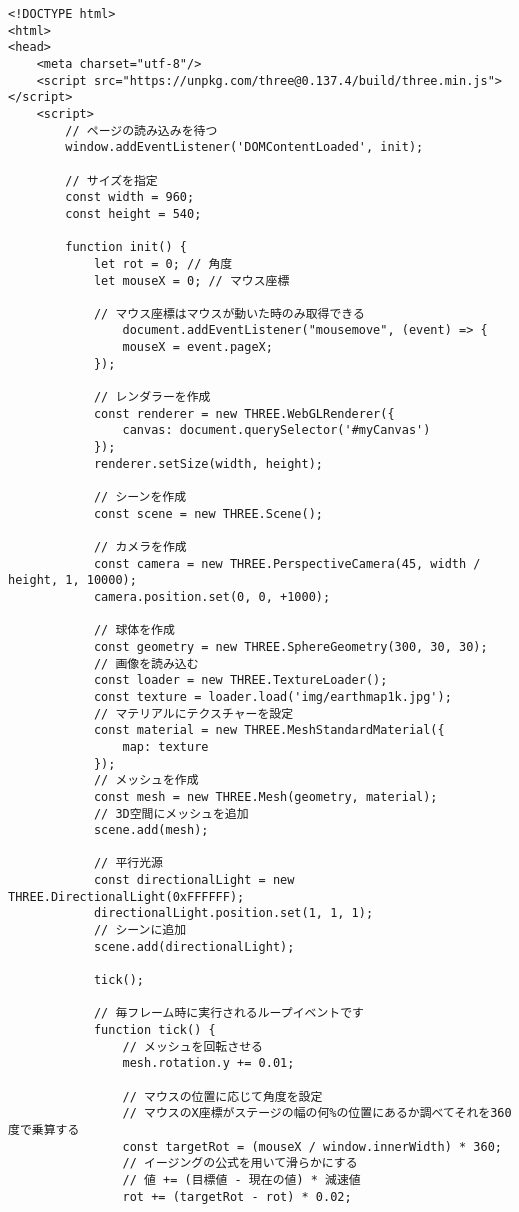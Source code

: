 \documentclass[mingoth,11pt,a4j,uplatex]{jsarticle}
\begin{document}
\begin{lstlisting}[caption=05-23.html]
<!DOCTYPE html>
<html>
<head>
    <meta charset="utf-8"/>
    <script src="https://unpkg.com/three@0.137.4/build/three.min.js"></script>
    <script>
        // ページの読み込みを待つ
        window.addEventListener('DOMContentLoaded', init);

        // サイズを指定
        const width = 960;
        const height = 540;

        function init() {
            let rot = 0; // 角度
            let mouseX = 0; // マウス座標

            // マウス座標はマウスが動いた時のみ取得できる
                document.addEventListener("mousemove", (event) => {
                mouseX = event.pageX;
            });

            // レンダラーを作成
            const renderer = new THREE.WebGLRenderer({
                canvas: document.querySelector('#myCanvas')
            });
            renderer.setSize(width, height);

            // シーンを作成
            const scene = new THREE.Scene();

            // カメラを作成
            const camera = new THREE.PerspectiveCamera(45, width / height, 1, 10000);
            camera.position.set(0, 0, +1000);

            // 球体を作成
            const geometry = new THREE.SphereGeometry(300, 30, 30);
            // 画像を読み込む
            const loader = new THREE.TextureLoader();
            const texture = loader.load('img/earthmap1k.jpg');
            // マテリアルにテクスチャーを設定
            const material = new THREE.MeshStandardMaterial({
                map: texture
            });
            // メッシュを作成
            const mesh = new THREE.Mesh(geometry, material);
            // 3D空間にメッシュを追加
            scene.add(mesh);

            // 平行光源
            const directionalLight = new THREE.DirectionalLight(0xFFFFFF);
            directionalLight.position.set(1, 1, 1);
            // シーンに追加
            scene.add(directionalLight);

            tick();

            // 毎フレーム時に実行されるループイベントです
            function tick() {
                // メッシュを回転させる
                mesh.rotation.y += 0.01;

                // マウスの位置に応じて角度を設定
                // マウスのX座標がステージの幅の何%の位置にあるか調べてそれを360度で乗算する
                const targetRot = (mouseX / window.innerWidth) * 360;
                // イージングの公式を用いて滑らかにする
                // 値 += (目標値 - 現在の値) * 減速値
                rot += (targetRot - rot) * 0.02;


\end{lstlisting}
\end{document}
